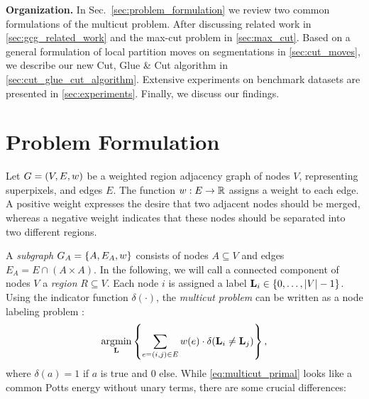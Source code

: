\vspace{0.1cm}
\noindent
\textbf{Organization.}
In Sec.~\ref{sec:problem_formulation} we review two common formulations
of the multicut problem. After discussing related work in
\cref{sec:gcg_related_work} and 
the max-cut problem in \cref{sec:max_cut}.
Based on a general formulation of local partition moves on segmentations in
\cref{sec:cut_moves},
we describe our new Cut, Glue \& Cut algorithm
in \cref{sec:cut_glue_cut_algorithm}. Extensive experiments
on benchmark datasets are presented in \cref{sec:experiments}.
Finally, we discuss our findings.







\section{Problem Formulation\label{sec:problem_formulation}}
Let $G=(V,E, w)$ be a weighted region adjacency graph of
nodes $V$, representing superpixels,
and edges $E$.
%
The function $w : E \rightarrow \mathbb{R}$ assigns a weight to each edge.
A positive weight expresses the desire that two adjacent nodes should
be merged, whereas a negative weight indicates
that these nodes should be separated into two different regions.

A \emph{subgraph} $G_A = \{A, E_A, w\}$ consists
of nodes $A \subseteq V$ and edges $E_A = E\cap (A\times A)$.
%
In the following, we will call a connected component
of nodes $V$ a \emph{region} $R \subseteq V$.
%
Each node $i$ is assigned a 
label $\mathbf{L}_{i} \in \{0, \dots, | V |-1\}$. Using the indicator 
function
$\delta(\cdot)$, the
\emph{multicut problem} can be written as a node labeling problem
\cite{bagon_2011_arxiv}:
%
\begin{align}
\operatorname*{\arg\!\min}_{\mathbf{L}}
    \left\{
    \sum_{ e=(i,j) \in E}
        w(e)
        \cdot \delta( \mathbf{L}_i \neq \mathbf{L}_j )
    \right\},
    \label{eq:multicut_primal}
\end{align}
%
where $\delta(a) = 1$ if $a$ is true and $0$ else.
%
While \eqref{eq:multicut_primal} looks like a common Potts energy without
unary terms, there are some crucial differences:

